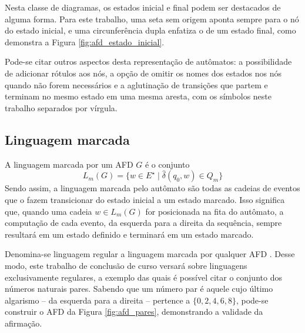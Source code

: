 
Nesta classe de diagramas, os estados inicial e final podem ser destacados de alguma forma. Para este trabalho, uma seta sem origem aponta sempre para o nó do estado inicial, e uma circunferência dupla enfatiza o de um estado final, como demonstra a Figura \ref{fig:afd_estado_inicial}.


Pode-se citar outros aspectos desta representação de autômatos: a possibilidade de adicionar rótulos aos nós, a opção de omitir os nomes dos estados nos nós quando não forem necessários e a aglutinação de transições que partem e terminam no mesmo estado em uma mesma aresta, com os símbolos neste trabalho separados por vírgula.

\subsection{Linguagem marcada}

A linguagem marcada por um AFD $G$ é o conjunto $$L_m(G) = \{ w \in E^\star \mid \hat{\delta}(q_0, w) \in Q_m \}$$ Sendo assim, a linguagem marcada pelo autômato são todas as cadeias de eventos que o fazem transicionar do estado inicial a um estado marcado. Isso significa que, quando uma cadeia $w \in L_m(G)$ for posicionada na fita do autômato, a computação de cada evento, da esquerda para a direita da sequência, sempre resultará em um estado definido e terminará em um estado marcado.

Denomina-se linguagem regular a linguagem marcada por qualquer AFD \cite{hopcroft}. Desse modo, este trabalho de conclusão de curso versará sobre linguagens exclusivamente regulares, a exemplo das quais é possível citar o conjunto dos números naturais pares. Sabendo que um número par é aquele cujo último algarismo -- da esquerda para a direita -- pertence a $\{ 0, 2, 4, 6, 8 \}$, pode-se construir o AFD da Figura \ref{fig:afd_pares}, demonstrando a validade da afirmação.

